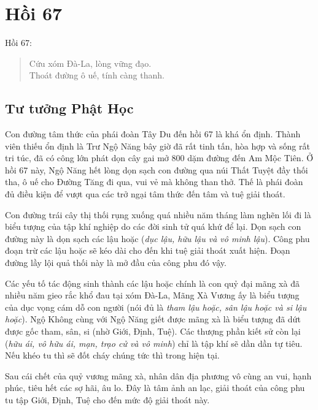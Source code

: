 \chapter{Hồi 67} %
\label{cha:hoi_67}

Hồi 67:

\begin{verse}
\begin{itshape}
Cứu xóm Đà-La, lòng vững đạo.\\
Thoát đường ô uế, tính càng thanh.
\end{itshape}
\end{verse}

\section{Tư tưởng Phật Học} %
\label{sec:67_phat_hoc}

Con đường tâm thức của phái đoàn Tây Du đến hồi 67 là khá ổn định. Thành viên thiếu ổn định là Trư Ngộ Năng bây giờ đã rất tinh tấn, hòa hợp và sống rất tri túc, đã có công lớn phát dọn cây gai mở 800 dặm đường đến Am Mộc Tiên. Ở hồi 67 này, Ngộ Năng hết lòng dọn sạch con đường qua núi Thất Tuyệt đầy thối tha, ô uế cho Đường Tăng đi qua, vui vẻ mà không than thở. Thế là phái đoàn đủ điều kiện để vượt qua các trở ngại tâm thức đến tâm và tuệ giải thoát.

Con đường trái cây thị thối rụng xuống quá nhiều năm tháng làm nghẽn lối đi là biểu tượng của tập khí nghiệp do các đời sinh tử quá khứ để lại. Dọn sạch con đường này là dọn sạch các lậu hoặc (\emph{dục lậu, hữu lậu và vô minh lậu}). Công phu đoạn trừ các lậu hoặc sẽ kéo dài cho đến khi tuệ giải thoát xuất hiện. Đoạn đường lầy lội quả thối này là mở đầu của công phu đó vậy.

Các yếu tố tác động sinh thành các lậu hoặc chính là con quỷ đại mãng xà đã nhiều năm gieo rắc khổ đau tại xóm Đà-La, Mãng Xà Vương ấy là biểu tượng của dục vọng cám dỗ con người (nói đủ là \emph{tham lậu hoặc, sân lậu hoặc và si lậu hoặc}). Ngộ Không cùng với Ngộ Năng giết được mãng xà là biểu tượng đã dứt được gốc tham, sân, si (nhờ Giới, Định, Tuệ). Các thượng phần kiết sử còn lại (\emph{hữu ái, vô hữu ái, mạn, trạo cử và vô minh}) chỉ là tập khí sẽ dần dần tự tiêu. Nếu khéo tu thì sẽ đốt cháy chúng tức thì trong hiện tại.

Sau cái chết của quỷ vương mãng xà, nhân dân địa phương vô cùng an vui, hạnh phúc, tiêu hết các sợ hãi, âu lo. Đây là tâm ảnh an lạc, giải thoát của công phu tu tập Giới, Định, Tuệ cho đến mức độ giải thoát này.


